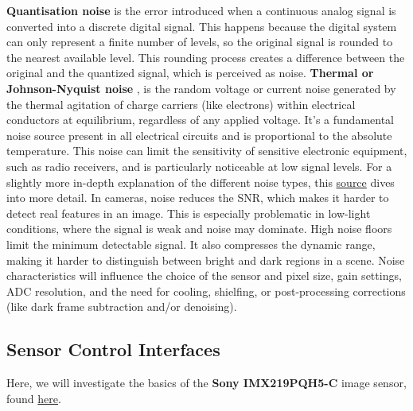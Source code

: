 \documentclass[10pt]{article}
\begin{document}
\begin{multicols}{2}
\newline \newline
\textbf{Quantisation noise} is the error introduced when a continuous analog signal is converted into a discrete digital signal. This happens because the digital system can only represent a finite number of levels, so the original signal is rounded to the nearest available level. This rounding process creates a difference between the original and the quantized signal, which is perceived as noise. 
\newline \newline
\textbf{Thermal or Johnson-Nyquist noise} , is the random voltage or current noise generated by the thermal agitation of charge carriers (like electrons) within electrical conductors at equilibrium, regardless of any applied voltage. It's a fundamental noise source present in all electrical circuits and is proportional to the absolute temperature. This noise can limit the sensitivity of sensitive electronic equipment, such as radio receivers, and is particularly noticeable at low signal levels. 
\newline \newline
For a slightly more in-depth explanation of the different noise types, this \href{https://www.thorlabs.com/newgrouppage9.cfm?objectgroup_id=10773}{source} dives into more detail. In cameras, noise reduces the SNR, which makes it harder to detect real features in an image. This is especially problematic in low-light conditions, where the signal is weak and noise may dominate.
High noise floors limit the minimum detectable signal. It also compresses the dynamic range, making it harder to distinguish between bright and dark regions in a scene.
Noise characteristics will influence the choice of  the sensor and pixel size, gain settings, ADC resolution, and the need for cooling, shielfing, or post-processing corrections (like dark frame subtraction and/or denoising).


\subsection{Sensor Control Interfaces}
\label{sec:sony-imx}
Here, we will investigate the basics of the \textbf{Sony IMX219PQH5-C} image sensor, found \href{https://www.opensourceinstruments.com/Electronics/Data/IMX219PQ.pdf}{here}.
\newline \newline

\end{multicols}
\end{document}
